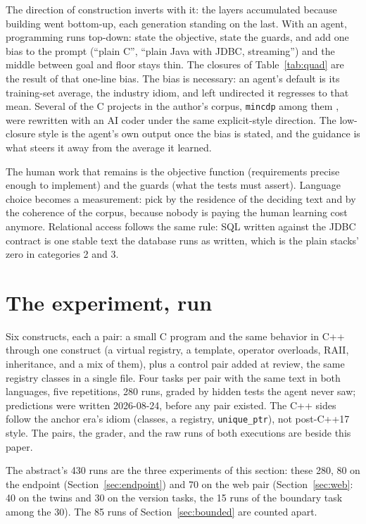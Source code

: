 \documentclass[journal]{IEEEtran}
\begin{document}
The direction of construction inverts with it: the layers accumulated
because building went bottom-up, each generation standing on the last. With an agent, programming runs
top-down: state the objective, state the guards, and add one bias to the
prompt (``plain C'', ``plain Java with JDBC, streaming'') and the middle
between goal and floor stays thin. The closures of Table~\ref{tab:quad} are
the result of that one-line bias. The bias is necessary: an agent's default is
its training-set average, the industry idiom, and left undirected it
regresses to that mean. Several of the C projects in the author's corpus,
\texttt{mincdp} among them \cite{mincdp}, were rewritten with an AI coder
under the same explicit-style direction. The low-closure style is the
agent's own output once the bias is stated, and the guidance is what
steers it away from the average it learned.

The human work that remains is the objective function (requirements
precise enough to implement) and the guards (what the tests must
assert).
Language choice becomes a measurement: pick by the residence of the
deciding text and by the coherence of the corpus, because nobody is
paying the human learning cost anymore.
Relational access follows the same rule: SQL written against the JDBC
contract \cite{jdbc,date} is one stable text the database runs as written,
which is the plain stacks' zero in categories 2 and 3.

\section{The experiment, run}
\label{sec:pairs}

Six constructs, each a pair: a small C program and the same behavior in
C++ through one construct (a virtual registry, a template, operator
overloads, RAII, inheritance, and a mix of them), plus a control pair
added at review, the same registry classes in a single file. Four tasks
per pair with the same text in both languages, five repetitions, 280
runs, graded by hidden tests the agent never saw; predictions were
written 2026-08-24, before any pair existed. The C++ sides follow the
anchor era's idiom (classes, a registry, \texttt{unique\_ptr}), not
post-C++17 style. The pairs, the grader, and the raw runs of both
executions are beside this paper.

The abstract's 430 runs are the three experiments of this section: these
280, 80 on the endpoint (Section~\ref{sec:endpoint}) and 70 on the web
pair (Section~\ref{sec:web}: 40 on the twins and 30 on the version
tasks, the 15 runs of the boundary task among the 30). The 85 runs of
Section~\ref{sec:bounded} are counted apart.
\end{document}
